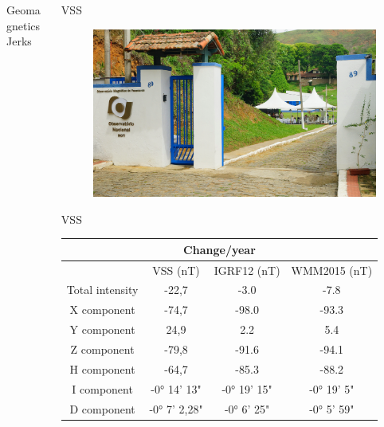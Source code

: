 \documentclass[final,t]{beamer}
\begin{document}
\begin{columns}[t]
\begin{column}{.66\linewidth}
\begin{columns}
\begin{column}{.31\linewidth}
\begin{block}{Geomagnetics Jerks}
		
		
		
		
		
	\end{block}
\end{column}	

\end{columns}

\end{column}
\begin{column}{.33\linewidth}


\begin{block}{VSS}
	\justifying
\begin{figure}
\centering
\includegraphics[width=0.7\linewidth]{OMV_JOELSONMOREIRA}
\caption{}
\label{fig:OMV_JOELSONMOREIRA}
\end{figure}





\end{block}

\begin{block}{VSS}
	\centering
\begin{tabular}{|c|c|c|c|}
		\hline
		\multicolumn{4}{|c|}{\textbf{Change/year}}\\	
	\hline   & VSS (nT)& IGRF12 (nT) & WMM2015 (nT)\\ 
	\hline Total intensity & -22,7  & -3.0  & -7.8  \\ 
	\hline X component & -74,7 & -98.0 & -93.3 \\ 
	\hline Y component & 24,9  & 2.2 & 5.4 \\ 
	\hline Z component & -79,8 & -91.6  & -94.1\\ 
	\hline H component  & -64,7 & -85.3 & -88.2\\ 
	\hline I component  & -0° 14' 13" & -0° 19' 15" &-0° 19' 5"\\ 
	\hline D component  & -0° 7' 2,28" & -0° 6' 25" & -0° 5' 59"\\ 
	\hline 
\end{tabular} 
	

\end{block}
\end{column}
\end{columns}
\end{document}
